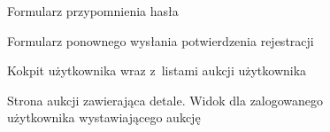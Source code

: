 \begin{figure}[h]
\centering
{}
\caption{Formularz przypomnienia hasła}
\label{screen11}
\end{figure}

\begin{figure}[h]
\centering
{}
\caption{Formularz ponownego wysłania potwierdzenia rejestracji}
\label{screen12}
\end{figure}

\begin{figure}[h]
\centering
{}
\caption{Kokpit użytkownika wraz z~listami aukcji użytkownika}
\label{screen04}
\end{figure}

\begin{figure}[h]
\centering
{}
\caption{Strona aukcji zawierająca detale. Widok dla zalogowanego użytkownika wystawiającego aukcję}
\label{screen05}
\end{figure}

